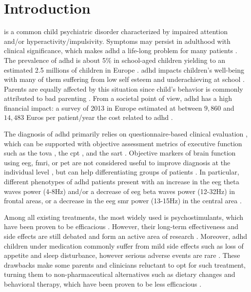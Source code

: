 

\section{Introduction} 

 is a common child psychiatric disorder characterized by impaired attention and/or hyperactivity/impulsivity.
Symptoms may persist in adulthood with clinical significance, which makes \gls{adhd} a life-long problem for many
patients \citep{Faraone2006}. The prevalence of \gls{adhd} is about 5\% in school-aged children yielding to an estimated
2.5 millions of children in Europe \citep{DSM-5}. \gls{adhd} impacts children's well-being with many of them suffering
from low self esteem \citep{Shaw2005} and underachieving at school \citep{Barry2002}. Parents are equally affected by this
situation since child's behavior is commonly attributed to bad parenting \citep{Harpin2005}. From a societal point
of view, \gls{adhd} has a high financial impact: a survey of 2013 in Europe estimated at between $9,860$ and 
$14,483$ Euros per patient/year the cost related to \gls{adhd} \citep{le2014}. 

The diagnosis of \gls{adhd} primarily relies on questionnaire-based clinical evaluation \citep{DSM-5}, which can be
supported with objective assessment metrics of executive function such as the \gls{tova} \citep{Forbes1998}, the
\gls{cpt} \citep{Barkley1991}, and the \gls{sart} \citep{Robertson1997}. Objective markers of brain function
using \gls{eeg}, \gls{fmri}, or \gls{pet} are not considered useful to improve diagnosis at the individual
level \citep{Neba}, but can help differentiating groups of patients \citep{Johnstone2005}.  
In particular, different phenotypes of \gls{adhd} patients present with an increase in the \gls{eeg} theta waves 
power (4-8Hz) and/or a decrease of \gls{eeg} beta waves power (12-32Hz) in frontal areas, or a decrease in the \gls{eeg} 
\gls{smr} power (13-15Hz) in the central area \citep{Monastra2005, Matouvsek1984, Janzen1995, loo2017}.  

Among all existing treatments, the most widely used is psychostimulants, which have been proven to be efficacious
\citep{Taylor2014, Storebo2015}. However, their long-term effectiveness and side effects are still debated and form 
an active area of research \citep{DuPaul1998, Swanson2001, Jensen1999}. Moreover, \gls{adhd} children under medication 
commonly suffer from mild side effects such as loss of appetite and sleep disturbance, however serious adverse events
are rare \citep{Storebo2015, Cooper2011}. These drawbacks make some parents and clinicians reluctant to 
opt for such treatment, turning them to non-pharmaceutical alternatives such as dietary changes \citep{Belanger2009} and behavioral 
therapy, which have been proven to be less efficacious \citep{Sonuga-Barke2013}.

